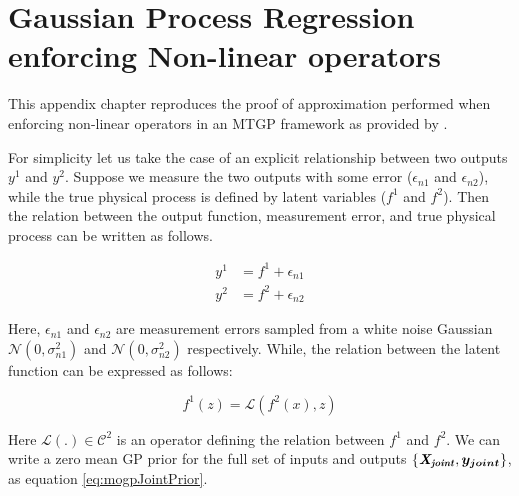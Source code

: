 \chapter{Gaussian Process Regression enforcing Non-linear operators}\label{appNonLinear}
This appendix chapter reproduces the proof of approximation performed when enforcing non-linear operators in an MTGP framework as provided by \cite{Constantinescu2013}.

For simplicity let us take the case of an explicit relationship between two outputs \(y^{1}\) and \(y^{2}\). Suppose we measure the two outputs with some error ($\epsilon_{n1}$ and $\epsilon_{n2}$), while the true physical process is defined by latent variables (\(f^{1}\) and \(f^{2}\)). Then the relation between the output function, measurement error, and true physical process can be written as follows. 

\begin{align} 
y^{1} & = f^{1} + \epsilon_{n1} \\
y^{2} & = f^{2} + \epsilon_{n2}
\end{align} 

Here, \(\epsilon_{n1}\) and \(\epsilon_{n2}\) are measurement errors sampled from a white noise Gaussian \(\mathcal{N}(0, \sigma_{n1}^2)\) and \(\mathcal{N}(0, \sigma_{n2}^2)\) respectively. While, the relation between the latent function can be expressed as follows:

\begin{equation}\label{eqOperation}
    f^{1}(z) = \mathcal{L}\left ( f^{2}(x), z \right )
\end{equation}

Here \(\mathcal{L} \left ( . \right ) \in \mathcal{C}^{2}\) is an operator defining the relation between \(f^{1}\) and \(f^{2}\). We can write a zero mean GP prior for the full set of inputs and outputs $\{\bm{\mathit{X_{joint}}}, \boldsymbol{y_{joint}}\}$, as equation \ref{eq:mogpJointPrior}. 

